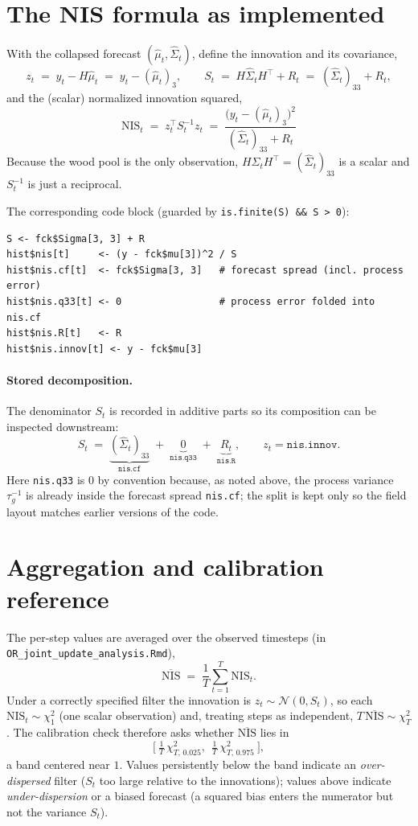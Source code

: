\documentclass{article}
\newcommand{\Norm}{\mathcal{N}}
\begin{document}
\section{The NIS formula as implemented}

With the collapsed forecast $(\hat\mu_t,\hat\Sigma_t)$, define the innovation and its
covariance,
\[
  z_t \;=\; y_t - H\hat\mu_t \;=\; y_t - (\hat\mu_t)_3,
  \qquad
  S_t \;=\; H\hat\Sigma_t H^\top + R_t \;=\; (\hat\Sigma_t)_{33} + R_t,
\]
and the (scalar) normalized innovation squared,
\[
  \boxed{\ \mathrm{NIS}_t \;=\; z_t^\top S_t^{-1} z_t \;=\; \dfrac{\big(y_t - (\hat\mu_t)_3\big)^2}{(\hat\Sigma_t)_{33} + R_t}\ }
\]
Because the wood pool is the only observation, $H\hat\Sigma_t H^\top = (\hat\Sigma_t)_{33}$
is a scalar and $S_t^{-1}$ is just a reciprocal.

The corresponding code block (guarded by \lstinline{is.finite(S) && S > 0}):
\begin{lstlisting}
S <- fck$Sigma[3, 3] + R
hist$nis[t]     <- (y - fck$mu[3])^2 / S
hist$nis.cf[t]  <- fck$Sigma[3, 3]   # forecast spread (incl. process error)
hist$nis.q33[t] <- 0                 # process error folded into nis.cf
hist$nis.R[t]   <- R
hist$nis.innov[t] <- y - fck$mu[3]
\end{lstlisting}

\paragraph{Stored decomposition.} The denominator $S_t$ is recorded in additive parts so
its composition can be inspected downstream:
\[
  S_t \;=\; \underbrace{(\hat\Sigma_t)_{33}}_{\texttt{nis.cf}}
        \;+\; \underbrace{0}_{\texttt{nis.q33}}
        \;+\; \underbrace{R_t}_{\texttt{nis.R}},
  \qquad z_t = \texttt{nis.innov}.
\]
Here \texttt{nis.q33} is $0$ by convention because, as noted above, the process variance
$\tau_g^{-1}$ is already inside the forecast spread \texttt{nis.cf}; the split is kept only
so the field layout matches earlier versions of the code.

\section{Aggregation and calibration reference}

The per-step values are averaged over the observed timesteps (in
\texttt{OR\_joint\_update\_analysis.Rmd}),
\[
  \overline{\mathrm{NIS}} \;=\; \frac{1}{T}\sum_{t=1}^{T} \mathrm{NIS}_t .
\]
Under a correctly specified filter the innovation is $z_t \sim \Norm(0, S_t)$, so each
$\mathrm{NIS}_t \sim \chi^2_{1}$ (one scalar observation) and, treating steps as
independent, $T\,\overline{\mathrm{NIS}} \sim \chi^2_{T}$. The calibration check therefore
asks whether $\overline{\mathrm{NIS}}$ lies in
\[
  \Big[\ \tfrac{1}{T}\,\chi^2_{T,\,0.025},\ \ \tfrac{1}{T}\,\chi^2_{T,\,0.975}\ \Big],
\]
a band centered near $1$. Values persistently below the band indicate an
\emph{over-dispersed} filter ($S_t$ too large relative to the innovations); values above
indicate \emph{under-dispersion} or a biased forecast (a squared bias enters the numerator
but not the variance $S_t$).
\end{document}
